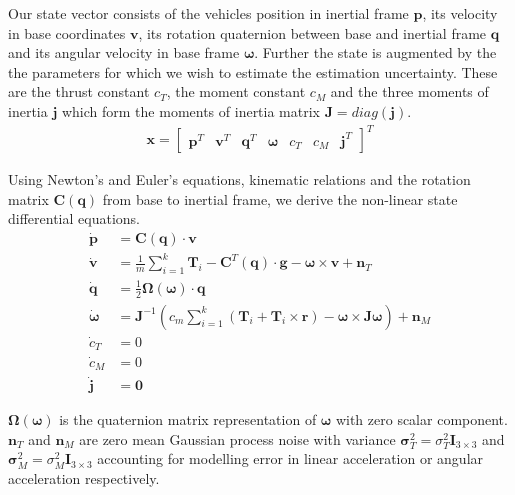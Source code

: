 \documentclass[10pt,a4paper]{article}
\begin{document}
Our state vector consists of the vehicles position in inertial frame $\mathbf{p}$, its velocity in base coordinates $\mathbf{v}$, its rotation quaternion between base and inertial frame $\mathbf{q}$ and its angular velocity in base frame $\boldsymbol{\omega}$. Further the state is augmented by the the parameters for which we wish to estimate the estimation uncertainty. These are the thrust constant $c_T$, the moment constant $c_M$ and the three moments of inertia $\mathbf{j}$ which form the moments of inertia matrix $\mathbf{J} = diag(\mathbf{j})$.
\begin{align}
\mathbf{x} = \begin{bmatrix}
\mathbf{p}^T & \mathbf{v}^T & \mathbf{q}^T & \boldsymbol{\omega} & c_T & c_M & \mathbf{j}^T
\end{bmatrix} ^T
\end{align}

Using Newton's and Euler's equations, kinematic relations and the rotation matrix $\mathbf{C}(\mathbf{q})$ from base to inertial frame, we derive the non-linear state differential equations.
\begin{subequations}
\begin{align}
\dot{\mathbf{p}} &= \mathbf{C}(\mathbf{q}) \cdot \mathbf{v} \\
\dot{\mathbf{v}} &= \frac{1}{m} \sum_{i=1}^k \mathbf{T}_i - \mathbf{C}^T(\mathbf{q}) \cdot \mathbf{g} - \boldsymbol{\omega} \times \mathbf{v} + \mathbf{n}_T \\
\dot{\mathbf{q}} &= \frac{1}{2} \boldsymbol{\Omega}(\boldsymbol{\omega}) \cdot \mathbf{q} \\
\dot{\boldsymbol{\omega}} &= \mathbf{J}^{-1} \left( c_m \sum_{i=1}^k \left( \mathbf{T}_i + \mathbf{T}_i \times \mathbf{r} \right) - \boldsymbol{\omega} \times \mathbf{J} \boldsymbol{\omega} \right) + \mathbf{n}_M \\
\dot{c}_T &= 0 \\
\dot{c}_M &= 0 \\
\dot{\mathbf{j}} &= \mathbf{0}
\end{align}
\end{subequations}

$\boldsymbol{\Omega}(\boldsymbol{\omega})$ is the quaternion matrix representation of $\boldsymbol{\omega}$ with zero scalar component. $\mathbf{n}_T$ and $\mathbf{n}_M$ are zero mean Gaussian process noise with variance $\boldsymbol{\sigma}_T^2 = \sigma_T^2 \mathbf{I}_{3\times3}$ and $\boldsymbol{\sigma}_M^2 = \sigma_M^2 \mathbf{I}_{3\times3}$ accounting for modelling error in linear acceleration or angular acceleration respectively.

\printbibliography
\end{document}
